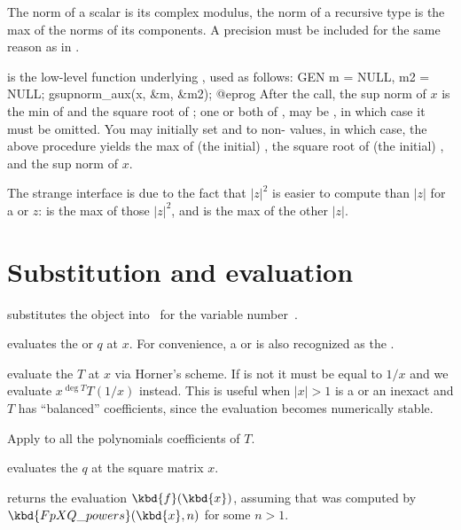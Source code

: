  The norm of a scalar is its complex
modulus, the norm of a recursive type is the max of the norms of its
components. A precision  must be included for the same reason as in
.

is the low-level function underlying
, used as follows:
\bprog
  GEN m = NULL, m2 = NULL;
  gsupnorm_aux(x, &m, &m2);
@eprog
After the call, the sup norm of $x$ is the min of  and the square root
of ;  one or both of ,  may be , in
which case it must be omitted. You may initially set  and  to
non- values, in which case, the above procedure yields the max of
(the initial) , the square root of (the initial) , and the sup
norm of $x$.

The strange interface is due to the fact that $|z|^2$ is easier to compute
than $|z|$ for a  or  $z$:  is the max of
those $|z|^2$, and  is the max of the other $|z|$.

\section{Substitution and evaluation}

 substitutes the object 
into~ for the variable number~.

 evaluates the  or 
$q$ at $x$. For convenience, a  or  is also recognized as
the  .

 evaluate the  $T$
at $x$ via Horner's scheme. If  is not  it must be equal to
$1/x$ and we evaluate $x^{\deg T}T(1/x)$ instead. This is useful when
$|x| > 1$ is a  or an inexact  and $T$ has
``balanced'' coefficients, since the evaluation becomes numerically stable.

 Apply  to
all the polynomials coefficients of $T$.

 evaluates the  $q$ at the
square matrix $x$.

 returns
the evaluation $\kbd{f}(\kbd{x})$, assuming that  was computed by
$\kbd{FpXQ\_powers}(\kbd{x}, n)$ for some $n>1$.

